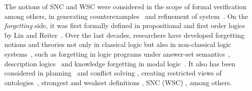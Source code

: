 \documentclass{article}
\begin{document}


The notions of SNC and WSC were considered in the scope of formal verification among others,  in generating counterexamples~\cite{dailler2018instrumenting} and refinement of  system~\cite{woodcock1990refinement}.
On the \emph{forgetting} side, it was first formally defined
in propositional and first order logics by Lin and Reiter~\cite{lin1994forget}.
Over the last decades, researchers have developed forgetting notions and theories not only in classical logic but also in non-classical logic systems~\cite{eiter2019brief}, such as forgetting in logic programs under answer-set semantics~\cite{DBLP:Zhang:AIJ2006,Eiter2008Semantic,Wong:PhD:Thesis,Yisong:KR:2012,Yisong:IJCAI:2013}, description logics~\cite{Wang:AMAI:2010,Lutz:IJCAI:2011,zhao2017role} and knowledge forgetting in modal logic~\cite{Yan:AIJ:2009,Kaile:JAIR:2009,Yongmei:IJCAI:2011,fang2019forgetting}. It also has been considered in planning~\cite{lin2003compiling} and conflict solving \cite{Lang2010Reasoning,Zhang2005Solving},
creating restricted views of ontologies~\cite{zhao2017role},
strongest and weakest definitions \cite{Lang2008On}, SNC (WSC) \cite{DBLP:journals/ai/Lin01}, among others.
\end{document}

